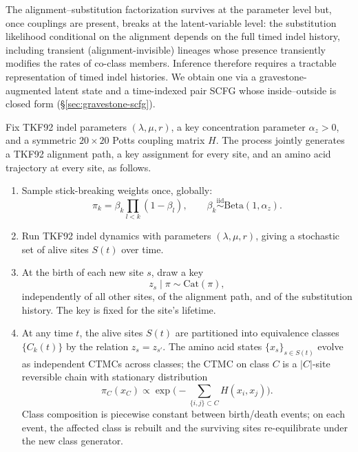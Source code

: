 The alignment--substitution factorization survives at the parameter
level but, once couplings are present, breaks at the latent-variable
level: the substitution likelihood conditional on the alignment
depends on the full timed indel history, including transient
(alignment-invisible) lineages whose presence transiently modifies
the rates of co-class members. Inference therefore requires a
tractable representation of timed indel histories. We obtain one
via a gravestone-augmented latent state and a time-indexed pair
SCFG whose inside--outside is closed form
(\S\ref{sec:gravestone-scfg}).

\begin{definition}[TKF-DP]
\label{defn:tkfdp}
Fix TKF92 indel parameters $(\lambda, \mu, r)$, a key concentration
parameter $\alpha_z > 0$, and a symmetric $20 \times 20$ Potts
coupling matrix $H$. The process jointly generates a TKF92
alignment path, a key assignment for every site, and an amino acid
trajectory at every site, as follows.
\begin{enumerate}
    \item Sample stick-breaking weights once, globally:
    \[
        \pi_k = \beta_k \prod_{l < k} (1 - \beta_l),
        \qquad
        \beta_k \stackrel{\text{iid}}{\sim} \mathrm{Beta}(1, \alpha_z).
    \]
    \item Run TKF92 indel dynamics with parameters $(\lambda, \mu, r)$,
      giving a stochastic set of alive sites $S(t)$ over time.
    \item At the birth of each new site $s$, draw a key
    \[
        z_s \mid \pi \sim \mathrm{Cat}(\pi),
    \]
    independently of all other sites, of the alignment path, and of
    the substitution history. The key is fixed for the site's
    lifetime.
    \item At any time $t$, the alive sites $S(t)$ are partitioned
      into equivalence classes $\{C_k(t)\}$ by the relation $z_s =
      z_{s'}$. The amino acid states $\{x_s\}_{s \in S(t)}$ evolve
      as independent CTMCs across classes; the CTMC on class $C$ is
      a $|C|$-site reversible chain with stationary distribution
    \[
        \pi_C(x_C) \propto \exp\!\Big(-\!\!\sum_{\{i,j\} \subset C} H(x_i, x_j)\Big).
    \]
    Class composition is piecewise constant between birth/death
    events; on each event, the affected class is rebuilt and the
    surviving sites re-equilibrate under the new class generator.
\end{enumerate}
\end{definition}


